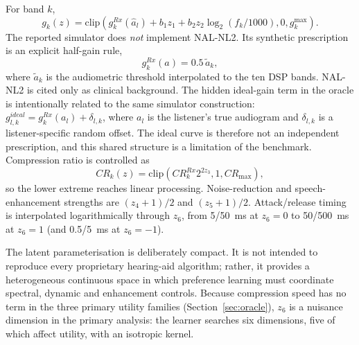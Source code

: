\documentclass[preprint,12pt]{elsarticle}
\begin{document}
For band $k$,
\begin{equation}
 g_k(z)=\mathrm{clip}\left(g^{Rx}_k(\hat a_l)+b_1z_1+b_2z_2\log_2(f_k/1000),0,g^{\max}_k\right).
 \label{eq:gain}
\end{equation}
The reported simulator does \emph{not} implement NAL-NL2. Its synthetic prescription is an explicit half-gain rule,
\begin{equation}
 g^{Rx}_k(a)=0.5\,\tilde a_k,
 \label{eq:halfgain}
\end{equation}
where $\tilde a_k$ is the audiometric threshold interpolated to the ten DSP bands. NAL-NL2 is cited only as clinical background. The hidden ideal-gain term in the oracle is intentionally related to the same simulator construction: $g^{ideal}_{l,k}=g^{Rx}_k(a_l)+\delta_{l,k}$, where $a_l$ is the listener's true audiogram and $\delta_{l,k}$ is a listener-specific random offset. The ideal curve is therefore not an independent prescription, and this shared structure is a limitation of the benchmark.
Compression ratio is controlled as
\begin{equation}
 CR_k(z)=\mathrm{clip}\left(CR^{Rx}_k 2^{2z_3},1,CR_{\max}\right),
 \label{eq:compression}
\end{equation}
so the lower extreme reaches linear processing. Noise-reduction and speech-enhancement strengths are $(z_4+1)/2$ and $(z_5+1)/2$. Attack/release timing is interpolated logarithmically through $z_6$, from 5/50~ms at $z_6=0$ to 50/500~ms at $z_6=1$ (and 0.5/5~ms at $z_6=-1$).

The latent parameterisation is deliberately compact. It is not intended to reproduce every proprietary hearing-aid algorithm; rather, it provides a heterogeneous continuous space in which preference learning must coordinate spectral, dynamic and enhancement controls. Because compression speed has no term in the three primary utility families (Section~\ref{sec:oracle}), $z_6$ is a nuisance dimension in the primary analysis: the learner searches six dimensions, five of which affect utility, with an isotropic kernel.
\end{document}
